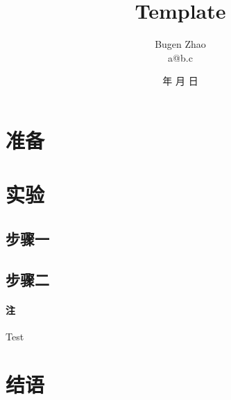 \documentclass[12pt,a4paper]{article}
\title{\textbf{Template}} %
\author{Bugen Zhao\quad 518000000000\\ a@b.c } %
\date{\number\year 年 \number\month 月 \number\day 日} %
\newcommand{\bugenfont}{\fontencoding{T1}\fontfamily{bch}\selectfont}
\begin{document}

\tabletopcaptrue

\maketitle %

\tableofcontents

\pagebreak

\section{准备}
\section{实验}
\subsection{步骤一}
\subsection{步骤二}
\paragraph{注} Test
\section{结语}


\pagebreak


%
%
\end{document}
